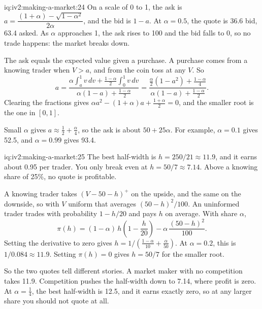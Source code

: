 \begin{solution}{iq:iv2:making-a-market:24}
On a scale of 0 to 1, the ask is $a = \dfrac{(1 + \alpha) - \sqrt{1 - \alpha^2}}{2\alpha}$, and the bid is $1 - a$. At $\alpha = 0.5$, the quote is 36.6 bid, 63.4 asked. As $\alpha$ approaches 1, the ask rises to 100 and the bid falls to 0, so no trade happens: the market breaks down.

The ask equals the expected value given a purchase. A purchase comes from a knowing trader when $V > a$, and from the coin toss at any $V$. So
\[
a = \frac{\alpha \int_a^1 v\,dv + \frac{1 - \alpha}{2} \int_0^1 v\,dv}{\alpha (1 - a) + \frac{1 - \alpha}{2}}
= \frac{\frac{\alpha}{2}(1 - a^2) + \frac{1 - \alpha}{4}}{\alpha(1 - a) + \frac{1 - \alpha}{2}}.
\]
Clearing the fractions gives $\alpha a^2 - (1 + \alpha)a + \frac{1 + \alpha}{2} = 0$, and the smaller root is the one in $[0, 1]$.

Small $\alpha$ gives $a \approx \frac12 + \frac{\alpha}{4}$, so the ask is about $50 + 25\alpha$. For example, $\alpha = 0.1$ gives 52.5, and $\alpha = 0.99$ gives 93.4.

\end{solution}

\begin{solution}{iq:iv2:making-a-market:25}
The best half-width is $h = 250/21 \approx 11.9$, and it earns about 0.95 per trader. You only break even at $h = 50/7 \approx 7.14$. Above a knowing share of 25\%, no quote is profitable.

A knowing trader takes $(V - 50 - h)^+$ on the upside, and the same on the downside, so with $V$ uniform that averages $(50 - h)^2/100$. An uninformed trader trades with probability $1 - h/20$ and pays $h$ on average. With share $\alpha$,
\[
\pi(h) = (1 - \alpha)\, h \left(1 - \frac{h}{20}\right) - \alpha\, \frac{(50 - h)^2}{100}.
\]
Setting the derivative to zero gives $h = 1\big/\left(\frac{1 - \alpha}{10} + \frac{\alpha}{50}\right)$. At $\alpha = 0.2$, this is $1/0.084 \approx 11.9$. Setting $\pi(h) = 0$ gives $h = 50/7$ for the smaller root.

So the two quotes tell different stories. A market maker with no competition takes 11.9. Competition pushes the half-width down to 7.14, where profit is zero. At $\alpha = \tfrac14$, the best half-width is 12.5, and it earns exactly zero, so at any larger share you should not quote at all.

\end{solution}

